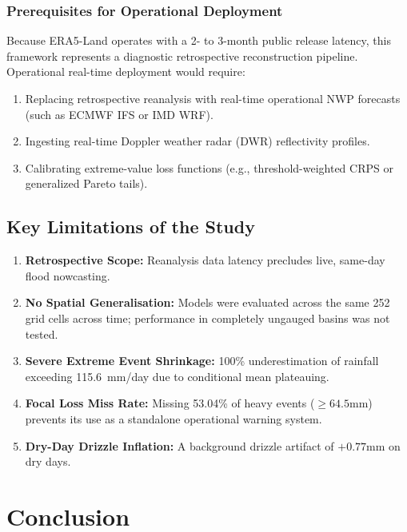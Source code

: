 \documentclass[12pt]{article}
\begin{document}
\subsubsection{Prerequisites for Operational Deployment}
Because ERA5-Land operates with a 2- to 3-month public release latency, this framework represents a diagnostic retrospective reconstruction pipeline. Operational real-time deployment would require:
\begin{enumerate}
    \item Replacing retrospective reanalysis with real-time operational NWP forecasts (such as ECMWF IFS or IMD WRF).
    \item Ingesting real-time Doppler weather radar (DWR) reflectivity profiles.
    \item Calibrating extreme-value loss functions (e.g., threshold-weighted CRPS or generalized Pareto tails).
\end{enumerate}

\subsection{Key Limitations of the Study}
\begin{enumerate}
    \item \textbf{Retrospective Scope:} Reanalysis data latency precludes live, same-day flood nowcasting.
    \item \textbf{No Spatial Generalisation:} Models were evaluated across the same 252 grid cells across time; performance in completely ungauged basins was not tested.
    \item \textbf{Severe Extreme Event Shrinkage:} 100\% underestimation of rainfall exceeding 115.6~mm/day due to conditional mean plateauing.
    \item \textbf{Focal Loss Miss Rate:} Missing 53.04\% of heavy events ($\ge 64.5$\;mm) prevents its use as a standalone operational warning system.
    \item \textbf{Dry-Day Drizzle Inflation:} A background drizzle artifact of $+0.77$\;mm on dry days.
\end{enumerate}

\newpage
\section{Conclusion}
\end{document}
